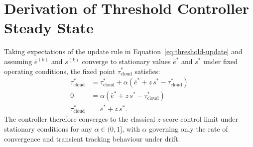 \chapter{Derivation of Threshold Controller Steady State}
\label{app:derivation}
Taking expectations of the update rule in Equation~\eqref{eq:threshold-update} and assuming
$\bar{e}^{(k)}$ and $s^{(k)}$ converge to stationary values $\bar{e}^{\ast}$ and $s^{\ast}$
under fixed operating conditions, the fixed point $\tau^{\ast}_{\text{cloud}}$ satisfies:
\begin{align}
\tau^{\ast}_{\text{cloud}} &= \tau^{\ast}_{\text{cloud}} + \alpha\left(\bar{e}^{\ast} + z\,s^{\ast} - \tau^{\ast}_{\text{cloud}}\right) \nonumber\\
0 &= \alpha\left(\bar{e}^{\ast} + z\,s^{\ast} - \tau^{\ast}_{\text{cloud}}\right) \nonumber\\
\tau^{\ast}_{\text{cloud}} &= \bar{e}^{\ast} + z\,s^{\ast}.
\end{align}
The controller therefore converges to the classical $z$-score control limit under stationary
conditions for any $\alpha \in (0,1]$, with $\alpha$ governing only the rate of convergence
and transient tracking behaviour under drift.
